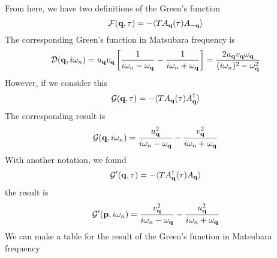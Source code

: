From here, we have two definitions of the Green's function
\begin{equation}
  \mathcal{F}(\mathbf{q},\tau) = -\langle T A_{\mathbf{q}}(\tau) A_{-\mathbf{q}} \rangle \label{eq:N_Green_tau}
\end{equation}
The corresponding Green's function in Matsubara frequency is
\begin{equation}
  \mathcal{D}(\mathbf{q},i\omega_n) =u_{\mathbf{q}} v_{\mathbf{q}} \left[ \frac{1}{i\omega_n-\omega_{\mathbf{q}}} - \frac{1}{i\omega_n + \omega_{\mathbf{q}}} \right]= \frac{2 u_{\mathbf{q}} v_{\mathbf{q}} \omega_{\mathbf{q}}}{(i\omega_n)^2 -\omega_{\mathbf{q}}^2}  \label{eq:N_Green}
\end{equation}
However, if we consider this
\begin{equation}
  \mathcal{G}(\mathbf{q},\tau) = - \langle T A_{\mathbf{q}}(\tau) A_{\mathbf{q}}^\dagger \rangle \label{eq:F_Green_tau}
\end{equation}
The corresponding result is
\begin{equation}
  \mathcal{G}(\mathbf{q},i\omega_n) = \frac{u_{\mathbf{q}}^2}{i\omega_n - \omega_{\mathbf{q}}} - \frac{v_{\mathbf{q}}^2}{i\omega_n + \omega_{\mathbf{q}}} \label{eq:F_Green}
\end{equation}
With another notation, we found
\begin{equation}
  \mathcal{G}'(\mathbf{q},\tau) = -\langle T A^\dagger_{\mathbf{q}}(\tau)A_{\mathbf{q}} \rangle \label{eq:F_Green2_tau}
\end{equation}
the result is
\begin{equation}
  \mathcal{G}'(\mathbf{p},i\omega_n) = \frac{v^2_{\mathbf{q}}}{i\omega_n-\omega_{\mathbf{q}}} - \frac{u_{\mathbf{q}}^2}{i\omega_n + \omega_{\mathbf{q}}} \label{eq:F_Green2}
\end{equation}
We can make a table for the result of the Green's function in Matsubara frequency

